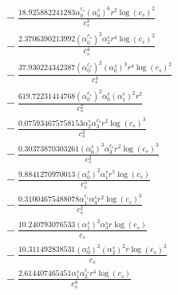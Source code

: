 \documentclass[10pt]{article}
\begin{document}
\begin{align*}
&{}  - \frac{18.925882241283 \alpha_{0}^{c_s} \left(\alpha_{0}^s\right)^{6} r^{2} \log{\left(c_{s} \right)}^{2}}{c_{s}^{2}} \\
&{}  - \frac{2.3706390213992 \left(\alpha_{0}^{c_s}\right)^{2} \alpha_{2}^s r^{4} \log{\left(c_{s} \right)}^{2}}{c_{s}^{4}} \\
&{}  - \frac{37.930224342387 \left(\alpha_{0}^{c_s}\right)^{2} \left(\alpha_{0}^s\right)^{3} r^{4} \log{\left(c_{s} \right)}^{2}}{c_{s}^{4}} \\
&{}  - \frac{619.72231414768 \left(\alpha_{0}^{c_s}\right)^{2} \alpha_{0}^s \left(\alpha_{1}^s\right)^{2} r^{2}}{c_{s}^{2}} \\
&{}  - \frac{0.075934675758153 \alpha_{2}^s \alpha_{3}^{c_s} r^{2} \log{\left(c_{s} \right)}^{3}}{c_{s}^{2}} \\
&{}  - \frac{0.30373870303261 \left(\alpha_{0}^s\right)^{3} \alpha_{3}^{c_s} r^{2} \log{\left(c_{s} \right)}^{3}}{c_{s}^{2}} \\
&{}  - \frac{9.8841270970013 \left(\alpha_{0}^s\right)^{2} \alpha_{1}^s r^{5} \log{\left(c_{s} \right)}}{c_{s}^{5}} \\
&{}  - \frac{0.31004675488078 \alpha_{1}^{c_s} \alpha_{4}^s r^{2} \log{\left(c_{s} \right)}^{3}}{c_{s}^{2}} \\
&{}  - \frac{10.240793076533 \left(\alpha_{1}^s\right)^{2} \alpha_{3}^s r \log{\left(c_{s} \right)}}{c_{s}} \\
&{}  - \frac{10.311492838531 \left(\alpha_{0}^s\right)^{2} \left(\alpha_{2}^s\right)^{2} r \log{\left(c_{s} \right)}^{2}}{c_{s}} \\
&{}  - \frac{2.614407465451 \alpha_{1}^s \alpha_{2}^{c_s} r^{4} \log{\left(c_{s} \right)}}{c_{s}^{4}}
\end{align*}
\end{document}
